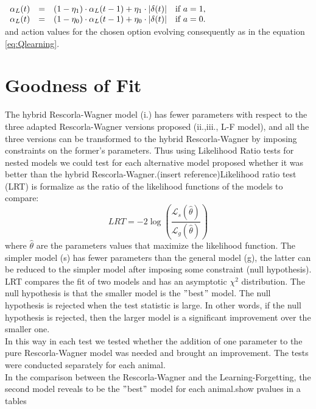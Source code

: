 \begin{description}
   $\begin{array}{lcll}
    \alpha_{L}(t) & = & (1-\eta_1)\cdot\alpha_{L}(t-1)+\eta_1\cdot\left\lvert\delta(t)\right\rvert & \mbox{if\,\,}  a=1,\\
    \alpha_{L}(t) & = & (1-\eta_0)\cdot\alpha_{L}(t-1)+\eta_0\cdot\left\lvert\delta(t)\right\rvert & \mbox{if\,\,}  a=0.\\
    \end{array}$\\
    and action values for the chosen option evolving consequently as in the equation \ref{eq:Qlearning}.
\end{description}
\section{Goodness of Fit}
\label{sec:Behavior}
The hybrid Rescorla-Wagner model (i.) has fewer parameters with respect to the three adapted Rescorla-Wagner versions proposed (ii.,iii., L-F model), and all the three versions can be transformed to the hybrid Rescorla-Wagner by imposing constraints on the former's parameters. Thus using Likelihood Ratio tests for nested models we could test for each alternative model proposed whether it was better than the hybrid Rescorla-Wagner.({\color{red}insert reference})Likelihood ratio test (LRT) is formalize as the ratio of the likelihood functions of the models to compare: 
\begin{equation}
LRT = -2 \log (\frac{\mathcal{L}_s(\hat{\theta})}{\mathcal{L}_g(\hat{\theta})})
\label{eq:LRT}
\end{equation}
where $\hat{\theta}$ are the parameters values that maximize the likelihood function.
The simpler model (s) has fewer parameters than the general model (g), the latter can be reduced to the simpler model after imposing some constraint (null hypothesis).\\
LRT compares the fit of two models and has an asymptotic $\chi^2$ distribution. The null hypothesis is that the smaller model is the $"$best$"$ model.  The null hypothesis is rejected when the test statistic is large. In other words, if the null hypothesis is rejected, then the larger model is a significant improvement over the smaller one.\\
In this way in each test we tested whether the addition of one parameter to the pure Rescorla-Wagner model was needed and brought an improvement. The tests were conducted separately for each animal.\\In the comparison between the Rescorla-Wagner and the Learning-Forgetting, the second model reveals to be the $"$best$"$ model for each animal.{\color{red}show pvalues in a tables}
